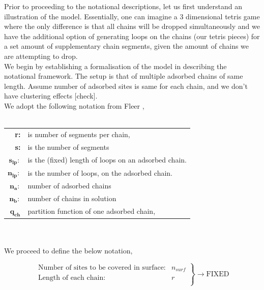 \documentclass[10pt,letterpaper]{article}
\begin{document}
\newpage
\noindent Prior to proceeding to the notational descriptions, let us first understand an illustration of the model. Essentially, one can imagine a 3 dimensional tetris game where the only difference is that all chains will be dropped simultaneously and we have the additional option of generating loops on the chains (our tetris pieces) for a set amount of supplementary chain segments, given the amount of chains we are attempting to drop.\\

\noindent We begin by establishing a formalisation of the model in describing the notational framework. The setup is that of multiple adsorbed chains of same length. Assume  number of adsorbed sites is same for each chain, and we don't have clustering effects [check].\\

\noindent We adopt the following notation from Fleer \cite{fleer1993polymers},\\\\

\begin{tabular}{r|l}
\hline
\textbf{r:} & is number of segments per chain,\\
\textbf{s:} & is the number of segments \\ 
$\mathbf{s_{lp}:}$ &is the (fixed) length of loops on an adsorbed chain.\\
$\mathbf{n_{lp}:}$ &is the number of loops, on the adsorbed chain.\\
$\mathbf{n_a:}$ &number of adsorbed chains\\
$\mathbf{n_b:}$&number of chains in solution\\
$\mathbf{q_{ch}}$&partition function of one adsorbed chain,\\
\hline
\end{tabular}\\\\ 

\noindent We proceed to define the below notation,

$$
\boxed{
    \left. %
        \begin{array}{ll}
            \text{Number of sites to be covered in surface:} & n_{surf}\\
            \text{Length of each chain:}& r\\
        \end{array}
    \right\}
    \rightarrow\text{FIXED}
}
$$
\end{document}
